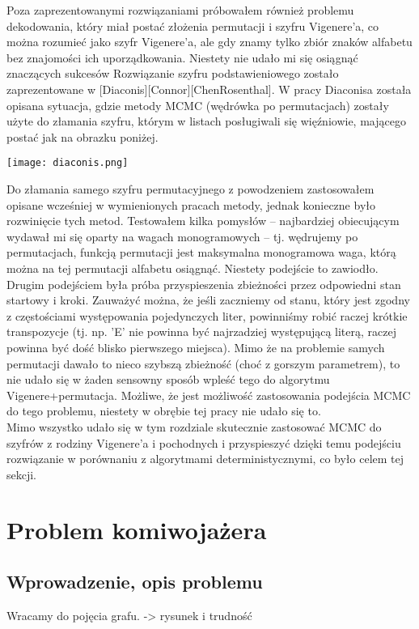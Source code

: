\documentclass[a4paper]{article}
\begin{document}
Poza zaprezentowanymi rozwiązaniami próbowałem również problemu dekodowania, który miał postać złożenia permutacji i szyfru Vigenere'a, co można rozumieć jako szyfr Vigenere'a, ale gdy znamy tylko zbiór znaków alfabetu bez znajomości ich uporządkowania. Niestety nie udało mi się osiągnąć znaczących sukcesów Rozwiązanie szyfru podstawieniowego zostało zaprezentowane w [Diaconis][Connor][ChenRosenthal]. W pracy  Diaconisa została opisana sytuacja, gdzie metody MCMC (wędrówka po permutacjach) zostały użyte do złamania szyfru, którym w listach posługiwali się więźniowie, mającego postać jak na obrazku poniżej.\\
\begin{center}
\texttt{[image: diaconis.png]}
\end{center}
Do złamania samego szyfru permutacyjnego z powodzeniem zastosowałem opisane wcześniej w wymienionych pracach metody, jednak konieczne było rozwinięcie tych metod. Testowałem kilka pomysłów – najbardziej obiecującym wydawał mi się oparty na wagach monogramowych – tj. wędrujemy po permutacjach, funkcją permutacji jest maksymalna monogramowa waga, którą można na tej permutacji alfabetu osiągnąć. Niestety podejście to zawiodło. Drugim podejściem była próba przyspieszenia zbieżności przez odpowiedni stan startowy i kroki. Zauważyć można, że jeśli zaczniemy od stanu, który jest zgodny z częstościami występowania pojedynczych liter, powinniśmy robić raczej krótkie transpozycje (tj. np. 'E' nie powinna być najrzadziej występującą literą, raczej powinna być dość blisko pierwszego miejsca). Mimo że na problemie samych permutacji dawało to nieco szybszą zbieżność (choć z gorszym parametrem), to nie udało się w żaden sensowny sposób wpleść tego do algorytmu Vigenere+permutacja. Możliwe, że jest możliwość zastosowania podejścia MCMC do tego problemu, niestety w obrębie tej pracy nie udało się to.
\\
Mimo wszystko udało się w tym rozdziale skutecznie zastosować MCMC do szyfrów z rodziny Vigenere'a i pochodnych i przyspieszyć dzięki temu podejściu rozwiązanie w porównaniu z algorytmami deterministycznymi, co było celem tej sekcji.
\section{Problem komiwojażera}
\subsection{Wprowadzenie, opis problemu}
Wracamy do pojęcia grafu.
-> rysunek i trudność
\end{document}
